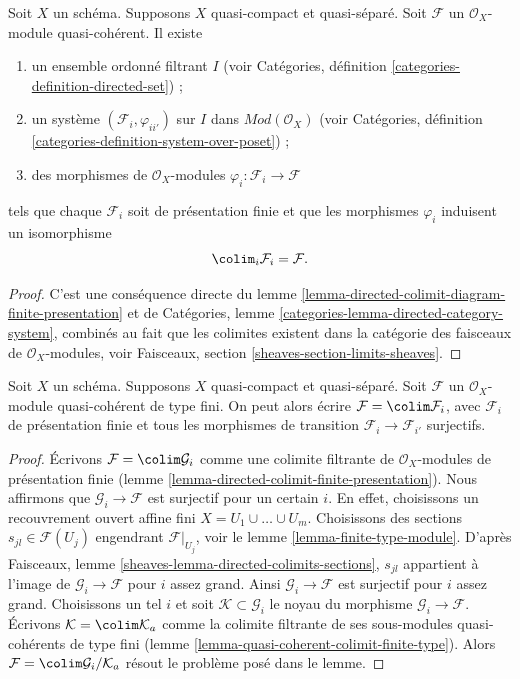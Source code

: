 \begin{lemma}
\label{lemma-directed-colimit-finite-presentation}
Soit $X$ un schéma. Supposons $X$ quasi-compact et quasi-séparé.
Soit $\mathcal{F}$ un $\mathcal{O}_X$-module
quasi-cohérent. Il existe
\begin{enumerate}
\item un ensemble ordonné filtrant $I$ (voir
Catégories, définition \ref{categories-definition-directed-set}) ;
\item un système $(\mathcal{F}_i, \varphi_{ii'})$
sur $I$ dans $\textit{Mod}(\mathcal{O}_X)$ (voir
Catégories, définition \ref{categories-definition-system-over-poset}) ;
\item des morphismes de $\mathcal{O}_X$-modules
$\varphi_i : \mathcal{F}_i \to \mathcal{F}$
\end{enumerate}
tels que chaque $\mathcal{F}_i$ soit de présentation
finie et que les morphismes $\varphi_i$ induisent un isomorphisme
$$
\colim_i \mathcal{F}_i
=
\mathcal{F}.
$$
\end{lemma}

\begin{proof}
C'est une conséquence directe du
lemme \ref{lemma-directed-colimit-diagram-finite-presentation} et
de Catégories, lemme \ref{categories-lemma-directed-category-system},
combinés au fait que les
colimites existent dans la catégorie des faisceaux de $\mathcal{O}_X$-modules, voir
Faisceaux, section \ref{sheaves-section-limits-sheaves}.
\end{proof}

\begin{lemma}
\label{lemma-finite-directed-colimit-surjective-maps}
Soit $X$ un schéma. Supposons $X$ quasi-compact et quasi-séparé.
Soit $\mathcal{F}$ un $\mathcal{O}_X$-module
quasi-cohérent de type fini. On peut alors écrire $\mathcal{F} = \colim \mathcal{F}_i$, avec $\mathcal{F}_i$
de présentation finie et tous les morphismes de transition
$\mathcal{F}_i \to \mathcal{F}_{i'}$ surjectifs.
\end{lemma}

\begin{proof}
Écrivons $\mathcal{F} = \colim \mathcal{G}_i$ comme une colimite
filtrante de $\mathcal{O}_X$-modules de
présentation finie (lemme \ref{lemma-directed-colimit-finite-presentation}).
Nous affirmons que $\mathcal{G}_i \to \mathcal{F}$ est surjectif pour un certain $i$.
En effet, choisissons un recouvrement ouvert affine fini $X = U_1 \cup \ldots \cup U_m$.
Choisissons des sections $s_{jl} \in \mathcal{F}(U_j)$ engendrant
$\mathcal{F}|_{U_j}$, voir le lemme \ref{lemma-finite-type-module}.
D'après Faisceaux, lemme \ref{sheaves-lemma-directed-colimits-sections},
$s_{jl}$ appartient à l'image de $\mathcal{G}_i \to \mathcal{F}$
pour $i$ assez grand. Ainsi $\mathcal{G}_i \to \mathcal{F}$ est surjectif
pour $i$ assez grand. Choisissons un tel $i$ et soit
$\mathcal{K} \subset \mathcal{G}_i$ le noyau du morphisme
$\mathcal{G}_i \to \mathcal{F}$. Écrivons $\mathcal{K} = \colim \mathcal{K}_a$
comme la colimite filtrante de ses sous-modules quasi-cohérents de type fini
(lemme \ref{lemma-quasi-coherent-colimit-finite-type}). Alors
$\mathcal{F} = \colim \mathcal{G}_i/\mathcal{K}_a$ résout le
problème posé dans le lemme.
\end{proof}

